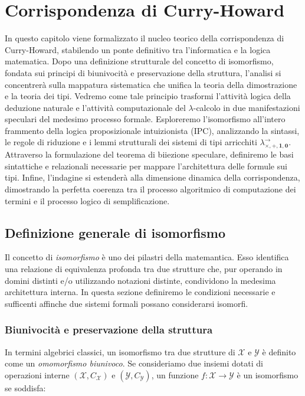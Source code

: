 \chapter{Corrispondenza di Curry-Howard}
\label{chap:curry_howard_isomorphism}

In questo capitolo viene formalizzato il nucleo teorico della corrispondenza di Curry-Howard, stabilendo un ponte definitivo tra l'informatica e la logica matematica. Dopo una 
definizione strutturale del concetto di isomorfismo, fondata sui principi di biunivocità e preservazione della struttura, l'analisi si concentrerà sulla mappatura sistematica 
che unifica la teoria della dimostrazione e la teoria dei tipi. Vedremo come tale principio trasformi l'attività logica della deduzione naturale e l'attività computazionale del 
$\lambda$-calcolo in due manifestazioni speculari del medesimo processo formale. Esploreremo l'isomorfismo all'intero frammento della logica proposizionale intuizionista (IPC), 
analizzando la sintassi, le regole di riduzione e i lemmi strutturali dei sistemi di tipi arricchiti $\lambda^{\to}_{\times, +, \mathbf{1}, \mathbf{0}}$. Attraverso la formulazione 
del teorema di biiezione speculare, definiremo le basi sintattiche e relazionali necessarie per mappare l'architettura delle formule sui tipi. Infine, l'indagine si estenderà alla 
dimensione dinamica della corrispondenza, dimostrando la perfetta coerenza tra il processo algoritmico di computazione dei termini e il processo logico di semplificazione.

\section{Definizione generale di isomorfismo}
\label{sec:isomorphism}
Il concetto di \emph{isomorfismo} è uno dei pilastri della matemantica. Esso identifica una relazione di equivalenza 
profonda tra due strutture che, pur operando in domini distinti e/o utilizzando notazioni distinte, condividono la 
medesima architettura interna. In questa sezione definiremo le condizioni necessarie e sufficenti affinche due sistemi 
formali possano considerarsi isomorfi. 

\subsection{Biunivocità e preservazione della struttura}
In termini algebrici classici, un isomorfismo tra due strutture di $\mathcal{X}$ e $\mathcal{Y}$ è definito come un 
\emph{omomorfismo biunivoco}. Se consideriamo due insiemi dotati di operazioni interne $(\mathcal{X}, C_{\mathcal{X}})$ 
e $(\mathcal{Y}, C_{\mathcal{Y}})$, un funzione $f: \mathcal{X} \to \mathcal{Y}$ è un isomorfismo se soddisfa:

